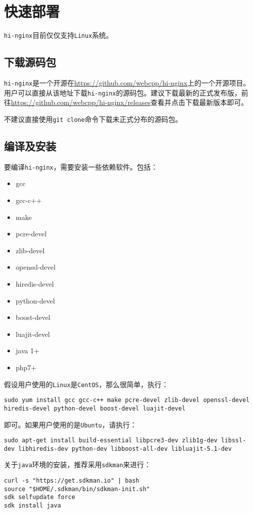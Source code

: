 \section{快速部署}
\texttt{hi-nginx}目前仅仅支持\texttt{Linux}系统。

\subsection{下载源码包}
\texttt{hi-nginx}是一个开源在\url{https://github.com/webcpp/hi-nginx}上的一个开源项目。用户可以直接从该地址下载\texttt{hi-nginx}的源码包。建议下载最新的正式发布版，前往\url{https://github.com/webcpp/hi-nginx/releases}查看并点击下载最新版本即可。

不建议直接使用\texttt{git clone}命令下载未正式分布的源码包。

\subsection{编译及安装}
要编译\texttt{hi-nginx}，需要安装一些依赖软件。包括：
\begin{itemize}
\item gcc
\item gcc-c++
\item make
\item pcre-devel
\item zlib-devel
\item openssl-devel
\item hiredis-devel
\item python-devel
\item boost-devel
\item luajit-devel
\item java 1+
\item php7+
\end{itemize}
假设用户使用的\texttt{Linux}是\texttt{CentOS}，那么很简单，执行：
\begin{lstlisting}
sudo yum install gcc gcc-c++ make pcre-devel zlib-devel openssl-devel hiredis-devel python-devel boost-devel luajit-devel
\end{lstlisting}
即可。如果用户使用的是\texttt{Ubuntu}，请执行：
\begin{lstlisting}
sudo apt-get install build-essential libpcre3-dev zlib1g-dev libssl-dev libhiredis-dev python-dev libboost-all-dev libluajit-5.1-dev 
\end{lstlisting}

关于\texttt{java}环境的安装，推荐采用\texttt{sdkman}来进行：
\begin{lstlisting}
curl -s "https://get.sdkman.io" | bash
source "$HOME/.sdkman/bin/sdkman-init.sh"
sdk selfupdate force
sdk install java
\end{lstlisting}

